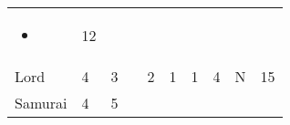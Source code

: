 \documentclass[12pt]{article}
\newcommand{\indexClass}[1]{\index{#1}}
\newcommand{\class}[1]{#1\indexClass{#1}}
\begin{document}
\begin{longtable}[]{@{}llllllllll@{}}
\begin{minipage}[t]{0.07\columnwidth}
\begin{itemize}
\item
\end{itemize}
\strut\end{minipage} &
\begin{minipage}[t]{0.08\columnwidth}\raggedright\strut
12
\strut\end{minipage}\tabularnewline
\begin{minipage}[t]{0.13\columnwidth}\raggedright\strut
\class{Lord}
\strut\end{minipage} &
\begin{minipage}[t]{0.06\columnwidth}\raggedright\strut
4
\strut\end{minipage} &
\begin{minipage}[t]{0.06\columnwidth}\raggedright\strut
3
\strut\end{minipage} &
\begin{minipage}[t]{0.06\columnwidth}\raggedright\strut
\strut\end{minipage} &
\begin{minipage}[t]{0.06\columnwidth}\raggedright\strut
2
\strut\end{minipage} &
\begin{minipage}[t]{0.06\columnwidth}\raggedright\strut
1
\strut\end{minipage} &
\begin{minipage}[t]{0.06\columnwidth}\raggedright\strut
1
\strut\end{minipage} &
\begin{minipage}[t]{0.06\columnwidth}\raggedright\strut
4
\strut\end{minipage} &
\begin{minipage}[t]{0.07\columnwidth}\raggedright\strut
N
\strut\end{minipage} &
\begin{minipage}[t]{0.08\columnwidth}\raggedright\strut
15
\strut\end{minipage}\tabularnewline
\begin{minipage}[t]{0.13\columnwidth}\raggedright\strut
\class{Samurai}
\strut\end{minipage} &
\begin{minipage}[t]{0.06\columnwidth}\raggedright\strut
4
\strut\end{minipage} &
\begin{minipage}[t]{0.06\columnwidth}\raggedright\strut
5
\strut\end{minipage} &
\begin{minipage}[t]{0.06\columnwidth}\raggedright\strut
\strut\end{minipage} &

\end{longtable}
\end{document}

